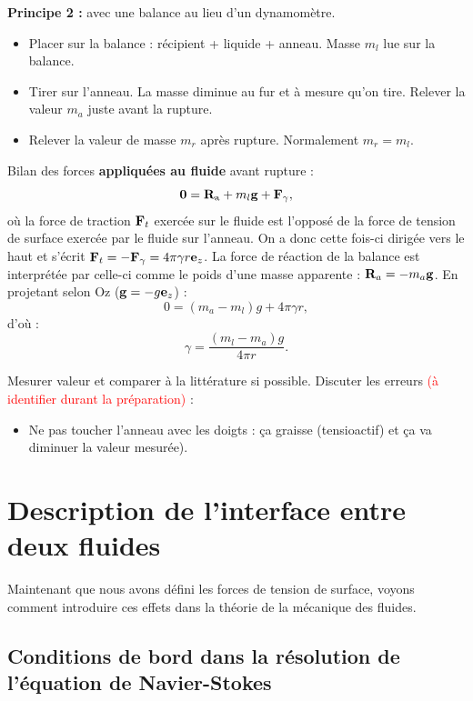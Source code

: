 \documentclass[11pt,a4paper]{report}
\begin{document}
\textbf{Principe 2 :} avec une balance au lieu d'un dynamomètre.
\begin{itemize}
	\item Placer sur la balance : récipient + liquide + anneau. Masse $m_l$ lue sur la balance.
	\item Tirer sur l'anneau. La masse diminue au fur et à mesure qu'on tire. Relever la valeur $m_a$ juste avant la rupture.
	\item Relever la valeur de masse $m_r$ après rupture. Normalement $m_r = m_l$.
\end{itemize}

Bilan des forces \textbf{appliquées au fluide} avant rupture :
\begin{equation}
	\bold{0} = \bold{R}_\text{a} + m_l\bold{g} + \bold{F}_\gamma,
\end{equation}
où la force de traction $\bold{F}_t$ exercée sur le fluide est l'opposé de la force de tension de surface exercée par le fluide sur l'anneau. On a donc cette fois-ci dirigée vers le haut et s'écrit $\bold{F}_t = -\bold{F}_\gamma = 4\pi\gamma r \bold{e}_z$. La force de réaction de la balance est interprétée par celle-ci comme le poids d'une masse apparente : $\bold{R}_a = - m_a \bold{g}$. En projetant selon Oz ($\bold{g} = - g\bold{e}_z$) :
\begin{equation}
	0 = (m_a - m_l) g + 4\pi\gamma r,
\end{equation}
d'où :
\begin{equation}
	\gamma = \frac{(m_l - m_a)g}{4\pi r}.
\end{equation}

Mesurer valeur et comparer à la littérature si possible. Discuter les erreurs \textcolor{red}{(à identifier durant la préparation)} :
\begin{itemize}
	\item Ne pas toucher l'anneau avec les doigts : ça graisse (tensioactif) et ça va diminuer la valeur mesurée).
\end{itemize}

\newpage
\section{Description de l'interface entre deux fluides}

Maintenant que nous avons défini les forces de tension de surface, voyons comment introduire ces effets dans la théorie de la mécanique des fluides.

\subsection{Conditions de bord dans la résolution de l'équation de Navier-Stokes}
\end{document}
